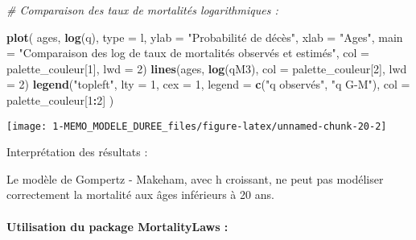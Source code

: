 \documentclass[
]{article}
\newenvironment{Shaded}{\begin{snugshade}}{\end{snugshade}}
\newcommand{\AttributeTok}[1]{\textcolor[rgb]{0.13,0.29,0.53}{#1}}
\newcommand{\CommentTok}[1]{\textcolor[rgb]{0.56,0.35,0.01}{\textit{#1}}}
\newcommand{\DecValTok}[1]{\textcolor[rgb]{0.00,0.00,0.81}{#1}}
\newcommand{\FunctionTok}[1]{\textcolor[rgb]{0.13,0.29,0.53}{\textbf{#1}}}
\newcommand{\NormalTok}[1]{#1}
\newcommand{\OtherTok}[1]{\textcolor[rgb]{0.56,0.35,0.01}{#1}}
\newcommand{\SpecialCharTok}[1]{\textcolor[rgb]{0.81,0.36,0.00}{\textbf{#1}}}
\newcommand{\StringTok}[1]{\textcolor[rgb]{0.31,0.60,0.02}{#1}}
\begin{document}
\begin{Shaded}
\begin{Highlighting}[]
\CommentTok{\# Comparaison des taux de mortalités logarithmiques : }

\FunctionTok{plot}\NormalTok{(}
\NormalTok{  ages,}
  \FunctionTok{log}\NormalTok{(q),}
  \AttributeTok{type =} \StringTok{\textquotesingle{}l\textquotesingle{}}\NormalTok{,}
  \AttributeTok{ylab =} \StringTok{"Probabilité de décès"}\NormalTok{,}
  \AttributeTok{xlab =} \StringTok{"Ages"}\NormalTok{,}
  \AttributeTok{main =} \StringTok{"Comparaison des log de taux de mortalités observés et estimés"}\NormalTok{,}
  \AttributeTok{col =}\NormalTok{ palette\_couleur[}\DecValTok{1}\NormalTok{],}
  \AttributeTok{lwd =} \DecValTok{2}\NormalTok{)}
\FunctionTok{lines}\NormalTok{(ages, }\FunctionTok{log}\NormalTok{(qM3), }\AttributeTok{col =}\NormalTok{ palette\_couleur[}\DecValTok{2}\NormalTok{], }\AttributeTok{lwd =} \DecValTok{2}\NormalTok{)}
\FunctionTok{legend}\NormalTok{(}\StringTok{"topleft"}\NormalTok{,}
  \AttributeTok{lty =} \DecValTok{1}\NormalTok{,}
  \AttributeTok{cex =} \DecValTok{1}\NormalTok{,}
  \AttributeTok{legend =} \FunctionTok{c}\NormalTok{(}\StringTok{"q observés"}\NormalTok{, }\StringTok{"q G{-}M"}\NormalTok{),}
  \AttributeTok{col =}\NormalTok{ palette\_couleur[}\DecValTok{1}\SpecialCharTok{:}\DecValTok{2}\NormalTok{]}
\NormalTok{)}
\end{Highlighting}
\end{Shaded}

\begin{center}\texttt{[image: 1-MEMO\_MODELE\_DUREE\_files/figure-latex/unnamed-chunk-20-2]} \end{center}

Interprétation des résultats :

Le modèle de Gompertz - Makeham, avec h croissant, ne peut pas modéliser
correctement la mortalité aux âges inférieurs à 20 ans.

\hypertarget{utilisation-du-package-mortalitylaws}{%
\paragraph{Utilisation du package MortalityLaws
:}\label{utilisation-du-package-mortalitylaws}}

\begin{Shaded}
\end{Shaded}
\end{document}
